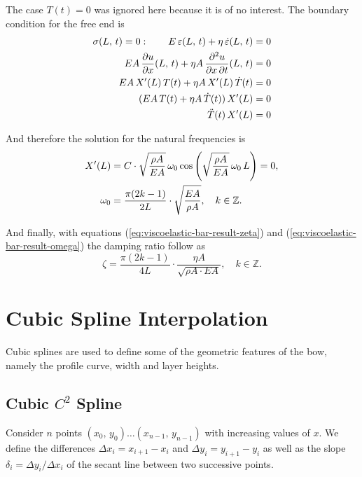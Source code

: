 The case $T(t) = 0$ was ignored here because it is of no interest. The boundary condition for the free end is
%
\begin{align}
\sigma(L,\,t) = 0: \quad\quad E\,\varepsilon(L,\,t) + \eta\,\dot{\varepsilon}(L,\,t) &= 0 \notag \\
EA\,\frac{\partial u}{\partial x}(L,\,t) + \eta A\,\frac{\partial^2 u}{\partial x\,\partial t}(L,\,t) &= 0 \notag \\
EA\,X'(L)\,T(t) + \eta A\,X'(L)\,\dot{T}(t) &= 0 \notag \\
(EA\,T(t) + \eta A\,\dot{T}(t))\,X'(L) &= 0 \notag \\
\ddot{T}(t)\,X'(L) &= 0 \notag
\end{align}

And therefore the solution for the natural frequencies is
%
\begin{align}
X'(L) &= C\cdot\sqrt{\frac{\rho A}{EA}}\,\omega_0\cos\left(\sqrt{\frac{\rho A}{EA}}\,\omega_0\,L\right) = 0, \notag \\
\omega_0 &= \frac{\pi(2k - 1)}{2L}\cdot\sqrt{\frac{EA}{\rho A}},\quad k \in \mathbb{Z}.\label{eq:viscoelastic-bar-result-omega}
\end{align}

And finally, with equations (\ref{eq:viscoelastic-bar-result-zeta}) and (\ref{eq:viscoelastic-bar-result-omega}) the damping ratio follow as
%
\begin{equation}
\zeta = \frac{\pi(2k - 1)}{4L}\cdot\frac{\eta A}{\sqrt{\rho A \cdot EA}},\quad k \in \mathbb{Z}.
\end{equation}

\chapter{Cubic Spline Interpolation}

Cubic splines are used to define some of the geometric features of the bow, namely the profile curve, width and layer heights.

\section{Cubic $C^2$ Spline}

Consider $n$ points $(x_{0},\,y_{0}) \ldots (x_{n-1},\,y_{n-1})$ with increasing values of $x$.
We define the differences $\Delta x_{i} = x_{i+1} - x_{i}$ and $\Delta y_{i} = y_{i+1} - y_{i}$ as well as the slope $\delta_{i} = \Delta y_{i} / \Delta x_{i}$ of the secant line between two successive points.

